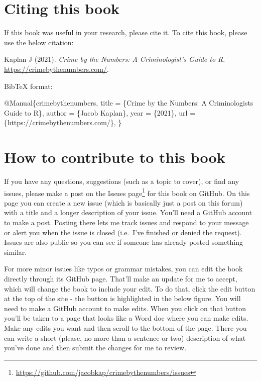 \documentclass[
  a4paper,
]{krantz}
\makeatletter
\newenvironment{Shaded}{\begin{snugshade}}{\end{snugshade}}
\newcommand{\DataTypeTok}[1]{\textcolor[rgb]{0.27,0.27,0.27}{#1}}
\newcommand{\NormalTok}[1]{#1}
\newcommand{\OtherTok}[1]{\textcolor[rgb]{0.37,0.37,0.37}{#1}}
\newcommand{\VariableTok}[1]{\textcolor[rgb]{0,0,0}{#1}}
\renewcommand{\href}[2]{#2\footnote{\url{#1}}}
\newenvironment{kframe}{%
\medskip{}
\setlength{\fboxsep}{.8em}
 \def\at@end@of@kframe{}%
 \ifinner\ifhmode%
  \def\at@end@of@kframe{\end{minipage}}%
  \begin{minipage}{\columnwidth}%
 \fi\fi%
 \def\FrameCommand##1{\hskip\@totalleftmargin \hskip-\fboxsep
 \colorbox{shadecolor}{##1}\hskip-\fboxsep
     \hskip-\linewidth \hskip-\@totalleftmargin \hskip\columnwidth}%
 \MakeFramed {\advance\hsize-\width
   \@totalleftmargin\z@ \linewidth\hsize
   \@setminipage}}%
 {\par\unskip\endMakeFramed%
 \at@end@of@kframe}
\renewenvironment{Shaded}{\begin{kframe}}{\end{kframe}}
\makeatother
\begin{document}
\hypertarget{citing-this-book}{%
\section*{Citing this book}\label{citing-this-book}}


If this book was useful in your research, please cite it. To
cite this book, please use the below citation:

Kaplan J (2021). \emph{Crime by the Numbers: A
Criminologist's Guide to R}.
\url{https://crimebythenumbers.com/}.

BibTeX format:

\begin{Shaded}
\begin{Highlighting}[]
\VariableTok{@Manual}\NormalTok{\{}\OtherTok{crimebythenumbers}\NormalTok{,}
  \DataTypeTok{title}\NormalTok{ = \{Crime by the Numbers: A Criminologist\textquotesingle{}s Guide to R\},}
  \DataTypeTok{author}\NormalTok{ = \{Jacob Kaplan\},}
  \DataTypeTok{year}\NormalTok{ = \{2021\},}
  \DataTypeTok{url}\NormalTok{ = \{https://crimebythenumbers.com/\},}
\NormalTok{\}}
\end{Highlighting}
\end{Shaded}

\hypertarget{how-to-contribute-to-this-book}{%
\section*{How to contribute to this
book}\label{how-to-contribute-to-this-book}}

If you have any questions, suggestions (such as a topic to
cover), or find any issues, please make a post on the
\href{https://github.com/jacobkap/crimebythenumbers/issues}{Issues
page} for this book on GitHub. On this page you can create a
new issue (which is basically just a post on this forum)
with a title and a longer description of your issue. You'll
need a GitHub account to make a post. Posting there lets me
track issues and respond to your message or alert you when
the issue is closed (i.e.~I've finished or denied the
request). Issues are also public so you can see if someone
has already posted something similar.

For more minor issues like typos or grammar mistakes, you
can edit the book directly through its GitHub page. That'll
make an update for me to accept, which will change the book
to include your edit. To do that, click the edit button at
the top of the site - the button is highlighted in the below
figure. You will need to make a GitHub account to make
edits. When you click on that button you'll be taken to a
page that looks like a Word doc where you can make edits.
Make any edits you want and then scroll to the bottom of the
page. There you can write a short (please, no more than a
sentence or two) description of what you've done and then
submit the changes for me to review.
\end{document}
